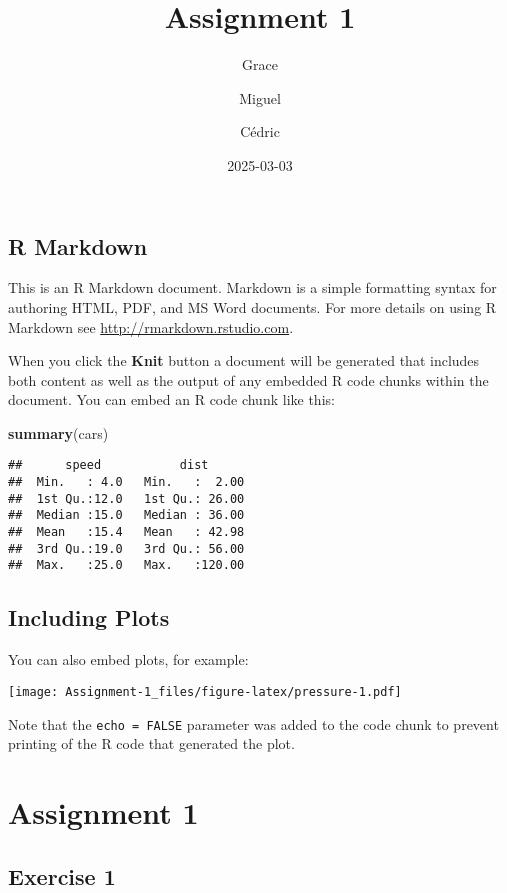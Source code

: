 \documentclass[
]{article}
\title{Assignment 1}
\author{Grace \and Miguel \and Cédric}
\date{2025-03-03}
\newenvironment{Shaded}{\begin{snugshade}}{\end{snugshade}}
\newcommand{\FunctionTok}[1]{\textcolor[rgb]{0.13,0.29,0.53}{\textbf{#1}}}
\newcommand{\NormalTok}[1]{#1}
\begin{document}
\maketitle

\subsection{R Markdown}\label{r-markdown}

This is an R Markdown document. Markdown is a simple formatting syntax
for authoring HTML, PDF, and MS Word documents. For more details on
using R Markdown see \url{http://rmarkdown.rstudio.com}.

When you click the \textbf{Knit} button a document will be generated
that includes both content as well as the output of any embedded R code
chunks within the document. You can embed an R code chunk like this:

\begin{Shaded}
\begin{Highlighting}[]
\FunctionTok{summary}\NormalTok{(cars)}
\end{Highlighting}
\end{Shaded}

\begin{verbatim}
##      speed           dist       
##  Min.   : 4.0   Min.   :  2.00  
##  1st Qu.:12.0   1st Qu.: 26.00  
##  Median :15.0   Median : 36.00  
##  Mean   :15.4   Mean   : 42.98  
##  3rd Qu.:19.0   3rd Qu.: 56.00  
##  Max.   :25.0   Max.   :120.00
\end{verbatim}

\subsection{Including Plots}\label{including-plots}

You can also embed plots, for example:

\texttt{[image: Assignment-1\_files/figure-latex/pressure-1.pdf]}

Note that the \texttt{echo\ =\ FALSE} parameter was added to the code
chunk to prevent printing of the R code that generated the plot.

\section{Assignment 1}\label{assignment-1}

\subsection{Exercise 1}\label{exercise-1}
\end{document}
